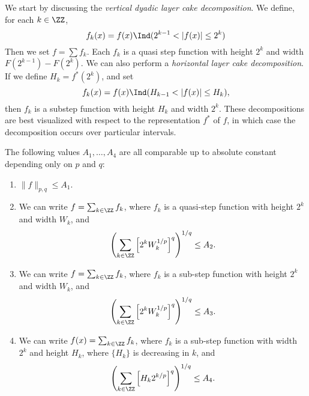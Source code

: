 We start by discussing the \emph{vertical dyadic layer cake decomposition}. We define, for each $k \in \ZZ$,
%
\[ f_k(x) = f(x) \Ind(2^{k-1} < |f(x)| \leq 2^k) \]
%
Then we set $f = \sum f_k$. Each $f_k$ is a quasi step function with height $2^k$ and width $F(2^{k-1}) - F(2^k)$. We can also perform a \emph{horizontal layer cake decomposition}. If we define $H_k = f^*(2^k)$, and set
%
\[ f_k(x) = f(x) \Ind(H_{k-1} < |f(x)| \leq H_k), \]
%
then $f_k$ is a substep function with height $H_k$ and width $2^k$. These decompositions are best visualized with respect to the representation $f^*$ of $f$, in which case the decomposition occurs over particular intervals.

\begin{theorem}
    The following values $A_1, \dots, A_4$ are all comparable up to absolute constant depending only on $p$ and $q$:
    \begin{enumerate}
        \item \label{onebound} $\| f \|_{p,q} \leq A_1$.

        \item \label{twobound} We can write $f = \sum_{k \in \ZZ} f_k$, where $f_k$ is a quasi-step function with height $2^k$ and width $W_k$, and
        \[ \left( \sum_{k \in \ZZ} \left[ 2^k W_k^{1/p} \right]^q \right)^{1/q} \leq A_2. \]

        \item \label{threebound} We can write $f = \sum_{k \in \ZZ} f_k$, where $f_k$ is a sub-step function with height $2^k$ and width $W_k$, and
        \[ \left( \sum_{k \in \ZZ} \left[2^{k} W_k^{1/p} \right]^q \right)^{1/q} \leq A_3. \]

        \item \label{fourbound} We can write $f(x) = \sum_{k \in \ZZ} f_k$, where $f_k$ is a sub-step function with width $2^k$ and height $H_k$, where $\{ H_k \}$ is decreasing in $k$, and
        \[ \left( \sum_{k \in \ZZ} \left[H_k 2^{k/p} \right]^q \right)^{1/q} \leq A_4. \]
    \end{enumerate}
\end{theorem}
